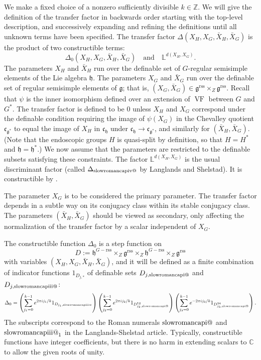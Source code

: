 \documentclass[12pt]{amsart}
\makeatletter
\newcommand*{\rom}[1]{\text{\expandafter\@slowromancap\romannumeral #1@}}
\newcommand{\op}[1]{\operatorname{#1}}
\newcommand{\ring}[1]{{\mathbb #1}}
\def\VF{{\op{VF}}}
\newcommand{\fg}{\mathfrak{g}}
\newcommand{\fc}{\mathfrak{c}}
\newcommand{\fh}{\mathfrak{h}}
\newcommand{\reg}{\mathrm{rss}}
\theoremstyle{plain}
\theoremstyle{definition}
\makeatother
\begin{document}
We make a fixed choice of a nonzero sufficiently divisible
$k\in\ring{Z}$.  We will give the definition of the transfer factor in
backwards order starting with the top-level description, and
successively expanding and refining the definitions until all unknown
terms have been specified.  The transfer factor $\Delta(X_H,X_G,\bar
X_H,\bar X_G)$ is the product of two constructible terms:
\[
\Delta_0(X_H,X_G,\bar
X_H,\bar X_G)\quad\text{and}\quad \ring{L}^{d(X_H,X_G)}.
\]
The parameters $X_H$ and $\bar X_H$ run over the definable set of
$G$-regular semisimple elements of the Lie algebra $\fh$.  The
parameters $X_G$ and $\bar X_G$ run over the definable set of regular
semisimple elements of $\fg$; that is, $(X_G,\bar X_G)\in
\fg^\reg\times_Z\fg^\reg$.  Recall that $\psi$ is the inner
isomorphism defined over an extension of $\VF$ between $G$ and $G^*$.
The transfer factor is defined to be $0$ unless $X_H$ and $X_G$
correspond under the definable condition requiring the image of
$\psi(X_G)$ in the Chevalley quotient $\fc_{\fg^*}$ to equal the image
of $X_H$ in $\fc_{\fh}$ under $\fc_{\fh}\to\fc_{\fg^*}$, and similarly
for $(\bar X_H,\bar X_G)$.  (Note that the endoscopic groups $H$ is
quasi-split by definition, so that $H=H^*$ and $\fh=\fh^*$.)  We now
assume that the parameters are restricted to the definable subsets
satisfying these constraints.  The factor $\ring{L}^{d(X_H,X_G)}$ is
the usual discriminant factor (called $\Delta_{\rom4}$ by Langlands
and Shelstad).  It is constructible by \cite{CHL}.

The parameter $X_G$ is to be considered the primary parameter.  The
transfer factor depends in a subtle way on its conjugacy class within
its stable conjugacy class. The parameters $(\bar X_H,\bar X_G)$
should be viewed as secondary, only affecting the normalization of the
transfer factor by a scalar independent of $X_G$.

The constructible function $\Delta_0$ is a step function on 
\begin{equation}\label{eqn:xfer-domain}
D:= \fh^{G-\reg}\times_Z\fg^\reg\times_Z \fh^{G-\reg}\times_Z\fg^\reg
\end{equation}
with variables $(X_H,X_G,\bar X_H,\bar X_G)$,
and it will
be defined as a finite combination of indicator functions $1_{D_{j,*}}$ of
definable sets $D_{j,{\rom{1}}}$ and $D_{j,\rom{3}}$:
\[
\Delta_0 = 
\left(\sum_{j_1=0}^{k-1} e^{2\pi i j_1/k} 1_{D_{j_1,{\rom{3}}}}\right)
\left(\sum_{j_2=0}^{k-1} e^{2\pi i j_2/k} 1_{D^{12}_{j_2,{\rom{1}}}}\right)
\left(\sum_{j_3=0}^{k-1} e^{-2\pi i j_3/k} 1_{D^{34}_{j_3,{\rom{1}}}}\right).
\]
The subscripts correspond to the Roman numerals $\rom1$ and $\rom3_1$
in the Langlands-Shelstad article.  Typically, constructible functions
have integer coefficients, but there is no harm in extending scalars
to $\ring{C}$ to allow the given roots of unity.
\end{document}
